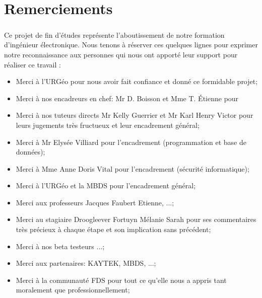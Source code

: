 \chapter*{Remerciements}
\paragraph{}
Ce projet de fin d’études représente l'aboutissement de notre formation d’ingénieur électronique. 
Nous tenons à réserver ces quelques lignes pour exprimer notre
reconnaissance aux personnes qui nous ont apporté leur support pour réaliser ce travail :

\begin{itemize}
    \item Merci à l'URGéo pour nous avoir fait confiance et donné ce formidable projet;\par
    \item Merci à nos encadreurs en chef: Mr D. Boisson et Mme T. Étienne pour \par
    \item Merci à nos tuteurs directs Mr Kelly Guerrier et Mr Karl Henry Victor pour leurs 
    jugements très fructueux et leur encadrement général;\par
    \item Merci à  Mr Elysée Villiard pour l'encadrement (programmation et base de données);\par
    \item Merci à Mme Anne Doris Vital pour l'encadrement (sécurité informatique);\par
    \item Merci à l'URGéo et la MBDS pour l'encadrement général;\par
    \item Merci aux professeurs Jacques Faubert Etienne, ...;\par
    \item Merci au stagiaire Droogleever Fortuyn Mélanie Sarah pour ses commentaires 
    très précieux à chaque étape et son implication sans précédent; \par
    \item Merci à nos beta testeurs ...;\par
    \item Merci aux partenaires: KAYTEK, MBDS, ...;\par
    \item Merci à la communauté FDS pour tout ce qu'elle nous a appris tant 
    moralement que professionnellement;\par
\end{itemize}
